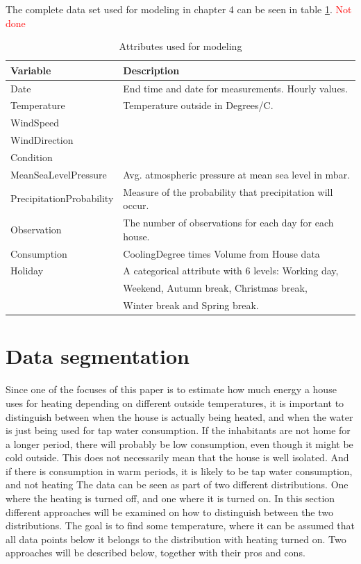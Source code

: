 \noindent The complete data set used for modeling in chapter 4 can be seen in table \ref{tab: modeldata}. \textcolor{red}{Not done}
\begin{table}
    \centering
    \begin{tabular}{ll}
     \hline
     \textbf{Variable} & \textbf{Description} \\
    \hline
    \hline
    Date  &  End time and date for measurements. Hourly values.\\
    Temperature  &  Temperature outside in Degrees/C. \\
    WindSpeed  &  \\ 
    WindDirection  &  \\
    Condition  & \\
    MeanSeaLevelPressure & Avg. atmospheric pressure at mean sea level in mbar.\\
    PrecipitationProbability & Measure of the probability that precipitation will occur. \\
    Observation & The number of observations for each day for each house.\\
    Consumption & CoolingDegree times Volume from House data \\
    Holiday & A categorical attribute with 6 levels: Working day, \\ & Weekend, Autumn break, Christmas break, \\ & Winter break and Spring break.\\
    \hline
    \end{tabular}
    \caption{Attributes used for modeling}
    \label{tab: modeldata}
\end{table}   

\section{Data segmentation}
Since one of the focuses of this paper is to estimate how much energy a house uses for heating
depending on different outside temperatures, it is important to distinguish between when the house
is actually being heated, and when the water is just being used for tap water consumption. If the
inhabitants are not home for a longer period, there will probably be low consumption, even though
it might be cold outside. This does not necessarily mean that the house is well isolated. And if
there is consumption in warm periods, it is likely to be tap water consumption, and not heating
The data can be seen as part of two different distributions. One where the heating is turned off,
 and one where it is turned on. In this section different approaches will be examined on how to
 distinguish between the two distributions.
The goal is to find some temperature, where it can be assumed that all data points below it belongs
to the distribution with heating turned on. Two approaches will be described below, together with
their pros and cons.

